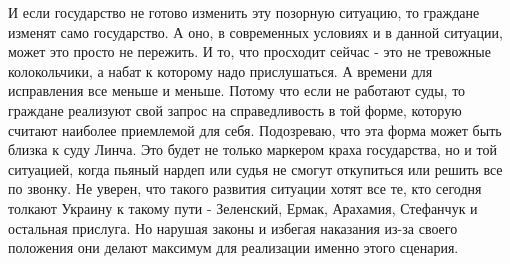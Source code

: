 И если государство не готово изменить эту позорную ситуацию, то граждане
изменят само государство. А оно, в современных условиях и в данной ситуации,
может это просто не пережить. И то, что просходит сейчас - это не тревожные
колокольчики, а набат к которому надо прислушаться. А времени для исправления
все меньше и меньше. Потому что если не работают суды, то граждане реализуют
свой запрос на справедливость в той форме, которую считают наиболее приемлемой
для себя. Подозреваю, что эта форма может быть близка к суду Линча. Это будет
не только маркером краха государства, но и той ситуацией, когда пьяный нардеп
или судья не смогут откупиться или решить все по звонку. Не уверен, что такого
развития ситуации хотят все те, кто сегодня толкают Украину к такому пути -
Зеленский, Ермак, Арахамия, Стефанчук и остальная прислуга. Но нарушая законы и
избегая наказания из-за своего положения они делают максимум для реализации
именно этого сценария.

